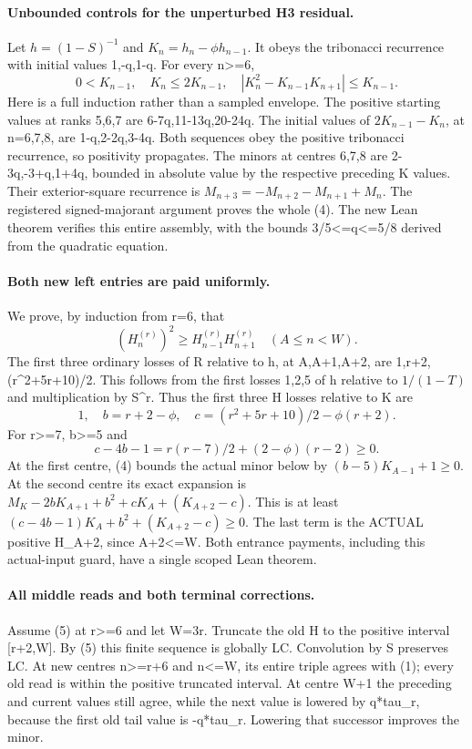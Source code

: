 \paragraph{Unbounded controls for the unperturbed H3 residual.}
Let $h=(1-S)^{-1}$ and $K_n=h_n-\phi h_{n-1}$. It obeys
the tribonacci recurrence with initial values 1,-q,1-q.
For every n>=6,
\[
 0<K_{n-1},\quad K_n\le2K_{n-1},\quad
 |K_n^2-K_{n-1}K_{n+1}|\le K_{n-1}.             \tag{4}
\]
Here is a full induction rather than a sampled envelope. The
positive starting values at ranks 5,6,7 are
6-7q,11-13q,20-24q. The initial values of
$2K_{n-1}-K_n$, at n=6,7,8, are 1-q,2-2q,3-4q.
Both sequences obey the positive tribonacci recurrence, so positivity
propagates. The minors at centres 6,7,8 are 2-3q,-3+q,1+4q,
bounded in absolute value by the respective preceding K values.
Their exterior-square recurrence is $M_{n+3}=-M_{n+2}-M_{n+1}+M_n$.
The registered signed-majorant argument proves the whole (4).
The new Lean theorem verifies this entire assembly, with the bounds
3/5<=q<=5/8 derived from the quadratic equation.

\paragraph{Both new left entries are paid uniformly.}
We prove, by induction from r=6, that
\[
 (H^{(r)}_n)^2\ge H^{(r)}_{n-1}H^{(r)}_{n+1}
                         \quad(A\le n<W).          \tag{5}
\]
The first three ordinary losses of R relative to h, at A,A+1,A+2,
are 1,r+2,(r^2+5r+10)/2. This follows from the first losses
1,2,5 of h relative to $1/(1-T)$ and multiplication by S^r.
Thus the first three H losses relative to K are
\[
           1,\quad b=r+2-\phi,\quad
           c=(r^2+5r+10)/2-\phi(r+2).             \tag{6}
\]
For r>=7, b>=5 and
\[
                c-4b-1=r(r-7)/2+(2-\phi)(r-2)\ge0.
\]
At the first centre, (4) bounds the actual minor below by
$(b-5)K_{A-1}+1\ge0$. At the second centre its exact expansion
is $M_K-2bK_{A+1}+b^2+cK_A+(K_{A+2}-c)$.
This is at least $(c-4b-1)K_A+b^2+(K_{A+2}-c)\ge0$.
The last term is the ACTUAL positive H_{A+2}, since A+2<=W.
Both entrance payments, including this actual-input guard, have a
single scoped Lean theorem.

\paragraph{All middle reads and both terminal corrections.}
Assume (5) at r>=6 and let W=3r. Truncate the old H to the
positive interval [r+2,W]. By (5) this finite sequence is globally
LC. Convolution by S preserves LC. At new centres n>=r+6 and
n<=W, its entire triple agrees with (1); every old read is within
the positive truncated interval. At centre W+1 the preceding and
current values still agree, while the next value is lowered by
q*tau_r, because the first old tail value is -q*tau_r. Lowering that
successor improves the minor.

